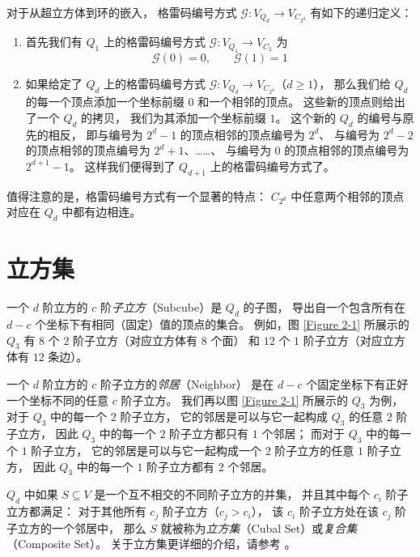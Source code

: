 对于从超立方体到环的嵌入，
格雷码编号方式 $\mathcal{G} \colon V_{Q_d} \rightarrow V_{C_{2^d}}$ 有如下的递归定义：
\begin{enumerate}[(1)]
	\item 首先我们有 $Q_1$ 上的格雷码编号方式
		$\mathcal{G} \colon V_{Q_1} \rightarrow V_{C_2}$ 为
		\begin{equation*}
		\mathcal{G}(0) = 0, \qquad \mathcal{G}(1) = 1
		\end{equation*}
	\item 如果给定了 $Q_d$ 上的格雷码编号方式
		$\mathcal{G} \colon V_{Q_d} \rightarrow V_{C_{2^d}}$（$d \ge 1$），
		那么我们给 $Q_d$ 的每一个顶点添加一个坐标前缀 $0$ 和一个相邻的顶点。
		这些新的顶点则给出了一个 $Q_d$ 的拷贝，
		我们为其添加一个坐标前缀 $1$。
		这个新的 $Q_d$ 的编号与原先的相反，
		即与编号为 $2^d - 1$ 的顶点相邻的顶点编号为 $2^d$、
		与编号为 $2^d - 2$ 的顶点相邻的顶点编号为 $2^d + 1$、……、
		与编号为 $0$ 的顶点相邻的顶点编号为 $2^{d + 1} - 1$。
		这样我们便得到了 $Q_{d + 1}$ 上的格雷码编号方式了。
\end{enumerate}
值得注意的是，格雷码编号方式有一个显著的特点：
$C_{2^d}$ 中任意两个相邻的顶点对应在 $Q_d$ 中都有边相连。

\section{立方集}
\label{Section 2.4}

一个 $d$ 阶立方的 $c$ 阶\emph{子立方}（Subcube）是 $Q_d$ 的子图，
导出自一个包含所有在 $d − c$ 个坐标下有相同（固定）值的顶点的集合。
例如，图 \ref{Figure 2-1} 所展示的 $Q_3$ 有 $8$ 个 $2$ 阶子立方（对应立方体有 $8$ 个面）
和 $12$ 个 $1$ 阶子立方（对应立方体有 $12$ 条边）。

一个 $d$ 阶立方的 $c$ 阶子立方的\emph{邻居}（Neighbor）
是在 $d − c$ 个固定坐标下有正好一个坐标不同的任意 $c$ 阶子立方。
我们再以图 \ref{Figure 2-1} 所展示的 $Q_3$ 为例，
对于 $Q_3$ 中的每一个 $2$ 阶子立方，
它的邻居是可以与它一起构成 $Q_3$ 的任意 $2$ 阶子立方，
因此 $Q_3$ 中的每一个 $2$ 阶子立方都只有 $1$ 个邻居；
而对于 $Q_3$ 中的每一个 $1$ 阶子立方，
它的邻居是可以与它一起构成一个 $2$ 阶子立方的任意 $1$ 阶子立方，
因此 $Q_3$ 中的每一个 $1$ 阶子立方都有 $2$ 个邻居。

$Q_d$ 中如果 $S \subseteq V$ 是一个互不相交的不同阶子立方的并集，
并且其中每个 $c_i$ 阶子立方都满足：
对于其他所有 $c_j$ 阶子立方（$c_j > c_i$），
该 $c_i$ 阶子立方处在该 $c_j$ 阶子立方的一个邻居中，
那么 $S$ 就被称为\emph{立方集}（Cubal Set）或\emph{复合集}（Composite Set）。
关于立方集更详细的介绍，请参考 \cite{Harper.2004}。
